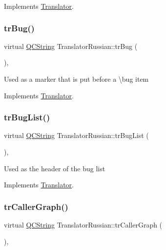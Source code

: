 Implements \mbox{\hyperlink{class_translator}{Translator}}.

\mbox{\label{class_translator_russian_a96482e95069ebcb6668ced8010422ff6}} 
\subsubsection{\texorpdfstring{trBug()}{trBug()}}
{\footnotesize\ttfamily virtual \mbox{\hyperlink{class_q_c_string}{Q\+C\+String}} Translator\+Russian\+::tr\+Bug (\begin{DoxyParamCaption}{ }\end{DoxyParamCaption})\hspace{0.3cm}{\ttfamily [inline]}, {\ttfamily [virtual]}}

Used as a marker that is put before a \textbackslash{}bug item 

Implements \mbox{\hyperlink{class_translator}{Translator}}.

\mbox{\label{class_translator_russian_a270b94e6b3336467065df4df34b52b93}} 
\subsubsection{\texorpdfstring{trBugList()}{trBugList()}}
{\footnotesize\ttfamily virtual \mbox{\hyperlink{class_q_c_string}{Q\+C\+String}} Translator\+Russian\+::tr\+Bug\+List (\begin{DoxyParamCaption}{ }\end{DoxyParamCaption})\hspace{0.3cm}{\ttfamily [inline]}, {\ttfamily [virtual]}}

Used as the header of the bug list 

Implements \mbox{\hyperlink{class_translator}{Translator}}.

\mbox{\label{class_translator_russian_a2fa7eeb2232bdc0faa2374d27af3100c}} 
\subsubsection{\texorpdfstring{trCallerGraph()}{trCallerGraph()}}
{\footnotesize\ttfamily virtual \mbox{\hyperlink{class_q_c_string}{Q\+C\+String}} Translator\+Russian\+::tr\+Caller\+Graph (\begin{DoxyParamCaption}{ }\end{DoxyParamCaption})\hspace{0.3cm}{\ttfamily [inline]}, {\ttfamily [virtual]}}

